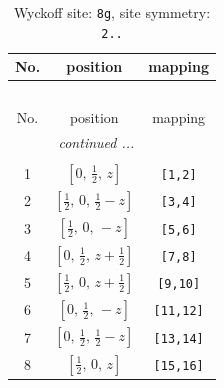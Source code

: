 \documentclass[fleqn,8pt]{jsarticle}
\begin{document}
\begin{longtable}{ccc}
\caption{Wyckoff site: {\tt 8g}, site symmetry: {\tt 2..}}
 \\
 \hline \hline
No. & position & mapping \\ \hline \endfirsthead

\multicolumn{2}{l}{\tablename\ \thetable{}} \\
 \hline \hline
No. & position & mapping \\ \hline \endhead

 \hline \hline
\multicolumn{2}{r}{\footnotesize\it continued ...} \\ \endfoot

 \hline \hline
\multicolumn{2}{r}{} \\ \endlastfoot

1 & $\left[ 0,\, \frac{1}{2},\, z \right]$ & {\tt [1,2]} \\ \hline
2 & $\left[ \frac{1}{2},\, 0,\, \frac{1}{2} - z \right]$ & {\tt [3,4]} \\ \hline
3 & $\left[ \frac{1}{2},\, 0,\, - z \right]$ & {\tt [5,6]} \\ \hline
4 & $\left[ 0,\, \frac{1}{2},\, z + \frac{1}{2} \right]$ & {\tt [7,8]} \\ \hline
5 & $\left[ \frac{1}{2},\, 0,\, z + \frac{1}{2} \right]$ & {\tt [9,10]} \\ \hline
6 & $\left[ 0,\, \frac{1}{2},\, - z \right]$ & {\tt [11,12]} \\ \hline
7 & $\left[ 0,\, \frac{1}{2},\, \frac{1}{2} - z \right]$ & {\tt [13,14]} \\ \hline
8 & $\left[ \frac{1}{2},\, 0,\, z \right]$ & {\tt [15,16]} \\
\end{longtable}
\renewcommand{\arraystretch}{1.2}
\end{document}
